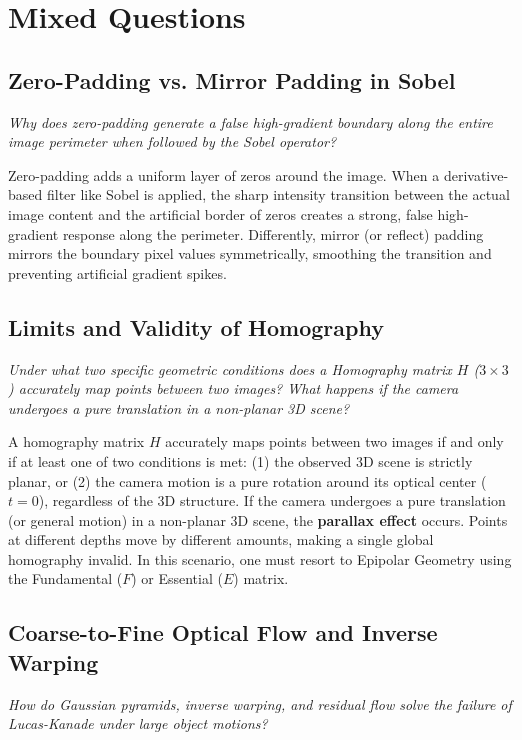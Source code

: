 
\section{Mixed Questions}

\subsection{Zero-Padding vs. Mirror Padding in Sobel}
\textit{Why does zero-padding generate a false high-gradient boundary along the entire image perimeter when followed by the Sobel operator?}

Zero-padding adds a uniform layer of zeros around the image. When a derivative-based filter like Sobel is applied, the sharp intensity transition between the actual image content and the artificial border of zeros creates a strong, false high-gradient response along the perimeter. Differently, mirror (or reflect) padding mirrors the boundary pixel values symmetrically, smoothing the transition and preventing artificial gradient spikes.

\subsection{Limits and Validity of Homography}
\textit{Under what two specific geometric conditions does a Homography matrix $H$ ($3 \times 3$) accurately map points between two images? What happens if the camera undergoes a pure translation in a non-planar 3D scene?}

A homography matrix $H$ accurately maps points between two images if and only if at least one of two conditions is met: (1) the observed 3D scene is strictly planar, or (2) the camera motion is a pure rotation around its optical center ($t = 0$), regardless of the 3D structure.
If the camera undergoes a pure translation (or general motion) in a non-planar 3D scene, the \textbf{parallax effect} occurs. Points at different depths move by different amounts, making a single global homography invalid. In this scenario, one must resort to Epipolar Geometry using the Fundamental ($F$) or Essential ($E$) matrix.

\subsection{Coarse-to-Fine Optical Flow and Inverse Warping}
\textit{How do Gaussian pyramids, inverse warping, and residual flow solve the failure of Lucas-Kanade under large object motions?}

